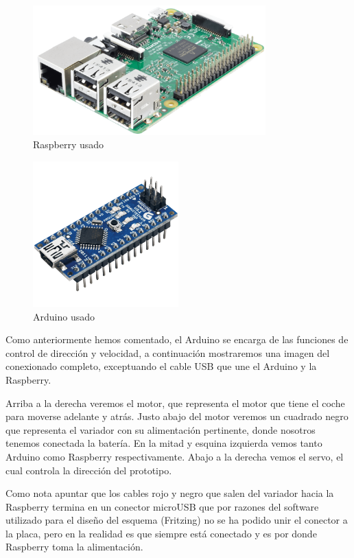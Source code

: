 \documentclass{pclass}
\begin{document}
\begin{itemize}
\begin{figure}[H]
	\centering
	\includegraphics[width=0.8\textwidth]{img/RASP}
	\caption{Raspberry usado}
	\label{fig:Rasp}
\end{figure}

\begin{figure}[H]
	\centering
	\includegraphics[width=0.5\textwidth]{img/arduinoNano}
	\caption{Arduino usado}
	\label{fig:Ard}
\end{figure}


Como anteriormente hemos comentado, el Arduino se encarga de las funciones de control de dirección y velocidad, a continuación mostraremos una imagen del conexionado completo, exceptuando el cable USB que une el Arduino y la Raspberry. 

Arriba a la derecha veremos el motor, que representa el motor que tiene el coche para moverse adelante y atrás. Justo abajo del motor veremos un cuadrado negro que representa el variador con su alimentación pertinente, donde nosotros tenemos conectada la batería. En la mitad y esquina izquierda vemos tanto Arduino como Raspberry respectivamente. Abajo a la derecha vemos el servo, el cual controla la dirección del prototipo.

Como nota apuntar que los cables rojo y negro que salen del variador hacia la Raspberry termina en un conector microUSB que por razones del software utilizado para el diseño del esquema (Fritzing) no se ha podido unir el conector a la placa, pero en la realidad es que siempre está conectado y es por donde Raspberry toma la alimentación.


\end{itemize}
\end{document}
